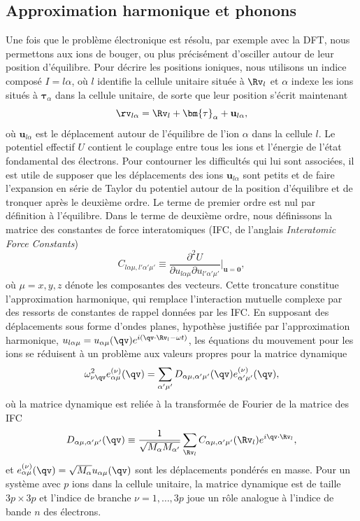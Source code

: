 \subsection{Approximation harmonique et phonons}\label{sec:phonon_harmonique}
Une fois que le problème électronique est résolu, par exemple avec la DFT, nous permettons aux ions de bouger, ou plus précisément d'osciller autour de leur position d'équilibre. Pour décrire les positions ioniques, nous utilisons un indice composé $I=l\alpha$, où $l$ identifie la cellule unitaire située à $\Rv_l$ et $\alpha$ indexe les ions situés à $\bm{\tau}_\alpha$ dans la cellule unitaire, de sorte que leur position s'écrit maintenant
\begin{equation}
    \rv_{l\alpha}=\Rv_l+\bm{\tau}_\alpha+\mathbf{u}_{l\alpha},
    \label{eqn:c2_rla}
\end{equation}
où $\mathbf{u}_{l\alpha}$ est le déplacement autour de l'équilibre de l'ion $\alpha$ dans la cellule $l$. Le potentiel effectif $U$ contient le couplage entre tous les ions et l'énergie de l'état fondamental des électrons. Pour contourner les difficultés qui lui sont associées, il est utile de supposer que les déplacements des ions $\mathbf{u}_{l\alpha}$ sont petits et de faire l'expansion en série de Taylor du potentiel autour de la position d'équilibre et de tronquer après le deuxième ordre. Le terme de premier ordre est nul par définition à l'équilibre. Dans le terme de deuxième ordre, nous définissons la matrice des constantes de force interatomiques (IFC, de l'anglais \textit{Interatomic Force Constants})
\begin{equation}
    C_{l\alpha\mu,l'\alpha'\mu'}\equiv \frac{\partial^2U}{\partial u_{l\alpha\mu}\partial u_{l'\alpha'\mu'}}\bigg\rvert_{\mathbf{u}=\mathbf{0}},
    \label{eqn:c2_IFC}
\end{equation}
où $\mu=x,y,z$ dénote les composantes des vecteurs. Cette troncature constitue l'approximation harmonique, qui remplace l'interaction mutuelle complexe par des ressorts de constantes de rappel données par les IFC. En supposant des déplacements sous forme d'ondes planes, hypothèse justifiée par l'approximation harmonique, $u_{l\alpha\mu}=u_{\alpha\mu}(\qv)e^{i(\qv\cdot\Rv_l-\omega t)}$, les équations du mouvement pour les ions se réduisent à un problème aux valeurs propres pour la matrice dynamique
\begin{equation}
    \omega_{\nu\qv}^2e_{\alpha\mu}^{(\nu)}(\qv)=\sum_{\alpha'\mu'}D_{\alpha\mu,\alpha'\mu'}(\qv)e_{\alpha'\mu'}^{(\nu)}(\qv),
    \label{eqn:c2_ionsEOM}
\end{equation}
où la matrice dynamique est reliée à la transformée de Fourier de la matrice des IFC
\begin{equation}
    D_{\alpha\mu,\alpha'\mu'}(\qv)\equiv\frac{1}{\sqrt{M_\alpha M_{\alpha'}}}\sum_{\Rv_l}C_{\alpha\mu,\alpha'\mu'}(\Rv_l)e^{i\qv\cdot\Rv_l},
    \label{eqn:c2_D}
\end{equation}
et $e_{\alpha\mu}^{(\nu)}(\qv) = \sqrt{M_\alpha}u_{\alpha\mu}(\qv)$ sont les déplacements pondérés en masse. Pour un système avec $p$ ions dans la cellule unitaire, la matrice dynamique est de taille $3p\times 3p$ et l'indice de branche $\nu=1,\dots,3p$ joue un rôle analogue à l'indice de bande $n$ des électrons.

